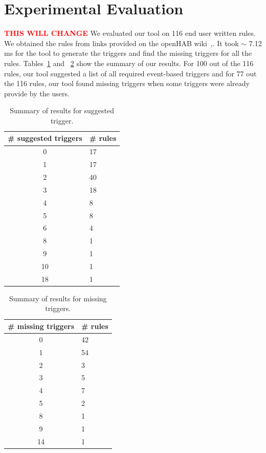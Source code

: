 \documentclass{sig-alternate-05-2015}
\newcommand\todo[1]{\textbf{\textcolor{red}{#1}}}
\begin{document}
\section{Experimental Evaluation}
\todo{THIS WILL CHANGE}
We evaluated our tool on 116 end user written rules. We obtained the rules from links provided on the openHAB wiki~\cite{data1},\cite{data2}. It took $\sim$ 7.12 ms for the tool to generate the triggers and find the missing triggers for all the rules. Tables~\ref{tab:results1} and ~\ref{tab:results2} show the summary of our results. For 100 out of the 116 rules, our tool suggested a list of all required event-based triggers and for 77 out the 116 rules, our tool found missing triggers when some triggers were already provide by the users.  
\begin{table}[h]
\centering
\begin{tabular}{|c|p{1.1cm}|}
\hline
\# suggested triggers & \# rules \\ \hline
0 & 17\\ \hline
1 & 17\\ \hline
2 & 40\\ \hline
3 & 18\\ \hline
4 & 8\\ \hline
5 & 8\\ \hline
6 & 4\\ \hline
8 & 1\\ \hline
9 & 1\\ \hline
10 & 1\\ \hline
18 & 1\\ \hline
\end{tabular}
\caption{Summary of results for suggested trigger.}
\label{tab:results1}
\end{table}

\begin{table}[h]
\centering
\begin{tabular}{|c|p{1.1cm}|}
\hline
\# missing triggers & \# rules \\ \hline
0 & 42 \\\hline
1 & 54 \\\hline
2 & 3 \\\hline
3 & 5\\\hline
4 & 7\\\hline
5 & 2\\\hline
8 & 1 \\\hline
9 & 1 \\\hline
14 & 1 \\\hline
\end{tabular}
\caption{Summary of results for missing triggers.}
\label{tab:results2}
\end{table}
\end{document}
